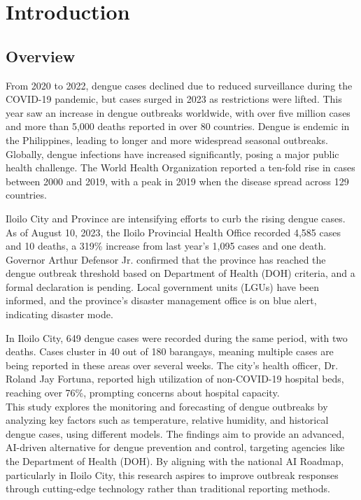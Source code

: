 \chapter{Introduction}
\label{sec:researchdesc}    %

\section{Overview}
\label{sec:overview}

From 2020 to 2022, dengue cases declined due to reduced surveillance during the COVID-19 pandemic, but cases surged in 2023 as restrictions were lifted. This year saw an increase in dengue outbreaks worldwide, with over five million cases and more than 5,000 deaths reported in over 80 countries. \cite{bosano2023who} Dengue is endemic in the Philippines, leading to longer and more widespread seasonal outbreaks. Globally, dengue infections have increased significantly, posing a major public health challenge. The World Health Organization \cite{WHO2024} reported a ten-fold rise in cases between 2000 and 2019, with a peak in 2019 when the disease spread across 129 countries.

Iloilo City and Province are intensifying efforts to curb the rising dengue cases. As of August 10, 2023, the Iloilo Provincial Health Office recorded 4,585 cases and 10 deaths, a 319\% increase from last year’s 1,095 cases and one death. Governor Arthur Defensor Jr. confirmed that the province has reached the dengue outbreak threshold based on Department of Health (DOH) criteria, and a formal declaration is pending. Local government units (LGUs) have been informed, and the province's disaster management office is on blue alert, indicating disaster mode. \cite{lena2024}

In Iloilo City, 649 dengue cases were recorded during the same period, with two deaths. Cases cluster in 40 out of 180 barangays, meaning multiple cases are being reported in these areas over several weeks. The city’s health officer, Dr. Roland Jay Fortuna, reported high utilization of non-COVID-19 hospital beds, reaching over 76\%, prompting concerns about hospital capacity.  
\\This study explores the monitoring and forecasting of dengue outbreaks by analyzing key factors such as temperature, relative humidity, and historical dengue cases, using different models. The findings aim to provide an advanced, AI-driven alternative for dengue prevention and control, targeting agencies like the Department of Health (DOH). By aligning with the national AI Roadmap, particularly in Iloilo City, this research aspires to improve outbreak responses through cutting-edge technology rather than traditional reporting methods.

